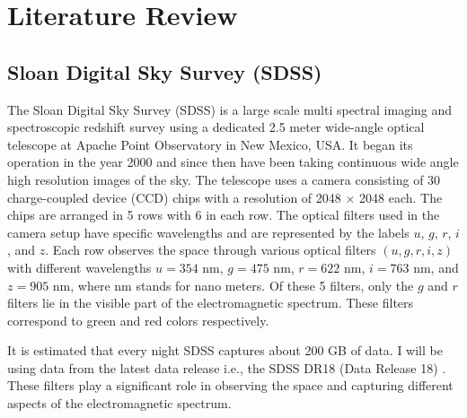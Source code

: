 \chapter{Literature Review}


\section{Sloan Digital Sky Survey (SDSS)} \label{sec:sectionsdss}

The Sloan Digital Sky Survey (SDSS) is a large scale multi spectral imaging and spectroscopic redshift survey using a dedicated 2.5 meter wide-angle optical telescope at Apache Point Observatory in New Mexico, USA. It began its operation in the year 2000 and since then have been taking continuous wide angle high resolution images of the sky. The telescope uses a camera consisting of 30 charge-coupled device (CCD) chips with a resolution of 2048 $\times$ 2048 each. The chips are arranged in 5 rows with 6 in each row. The optical filters used in the camera setup have specific wavelengths and are represented by the labels $u$, $g$, $r$, $i$, and $z$. Each row observes the space through various optical filters $(u, g, r, i, z)$ with different wavelengths $u = 354$ nm, $g = 475$ nm, $r = 622$ nm, $i = 763$ nm, and $z = 905$ nm, where nm stands for nano meters. Of these 5 filters, only the $g$ and $r$ filters lie in the visible part of the electromagnetic spectrum. These filters correspond to green and red colors respectively.

It is estimated that every night SDSS captures about 200 GB of data. I will be using data from the latest data release i.e., the SDSS DR18 (Data Release 18) \citep{SDSSDR18}.
 These filters play a significant role in observing the space and capturing different aspects of the electromagnetic spectrum.
